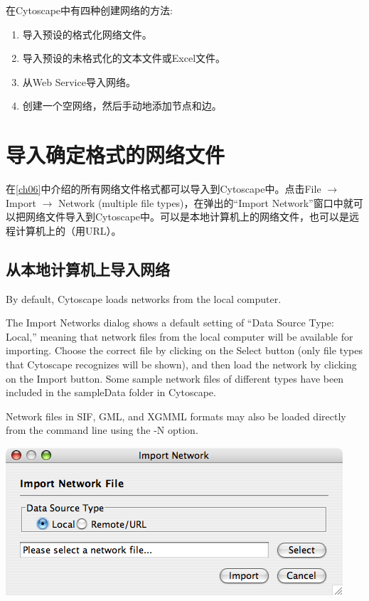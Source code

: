 在Cytoscape中有四种创建网络的方法:
\begin{enumerate}
\item 导入预设的格式化网络文件。
\item 导入预设的未格式化的文本文件或Excel文件。
\item 从Web Service导入网络。
\item 创建一个空网络，然后手动地添加节点和边。
\end{enumerate}
\section{导入确定格式的网络文件}

在\ref{ch06}中介绍的所有网络文件格式都可以导入到Cytoscape中。点击File $\rightarrow$ Import $\rightarrow$ Network (multiple file types)，在弹出的``Import Network''窗口中就可以把网络文件导入到Cytoscape中。可以是本地计算机上的网络文件，也可以是远程计算机上的（用URL）。

 \subsection{从本地计算机上导入网络}
 By default, Cytoscape loads networks from the local computer. 

 The Import Networks dialog shows a default setting of ``Data Source Type: Local,'' meaning that network files from the local computer will be available for importing. Choose the correct file by clicking on the Select button (only file types that Cytoscape recognizes will be shown), and then load the network by clicking on the Import button. Some sample network files of different types have been included in the sampleData folder in Cytoscape. 

 Network files in SIF, GML, and XGMML formats may also be loaded directly from the command line using the -N option. 
\begin{center}
\includegraphics[wdith=\textwidth]{images/network_import_dialog1_25.png} 
\end{center}

